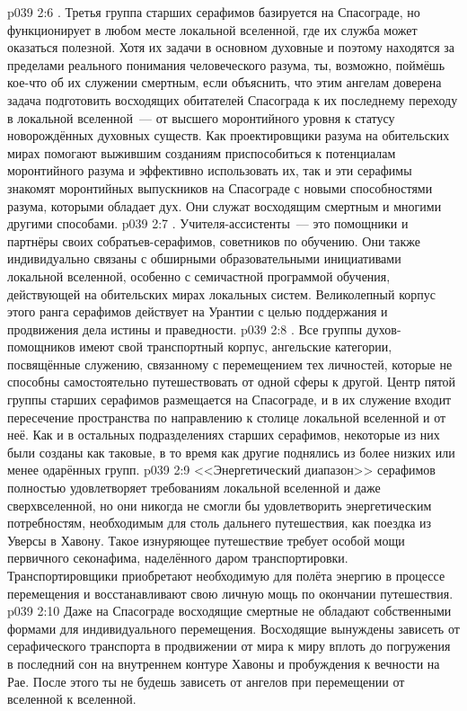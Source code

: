 \vs p039 2:6 . Третья группа старших серафимов базируется на Спасограде, но функционирует в любом месте локальной вселенной, где их служба может оказаться полезной. Хотя их задачи в основном духовные и поэтому находятся за пределами реального понимания человеческого разума, ты, возможно, поймёшь кое-что об их служении смертным, если объяснить, что этим ангелам доверена задача подготовить восходящих обитателей Спасограда к их последнему переходу в локальной вселенной~--- от высшего моронтийного уровня к статусу новорождённых духовных существ. Как проектировщики разума на обительских мирах помогают выжившим созданиям приспособиться к потенциалам моронтийного разума и эффективно использовать их, так и эти серафимы знакомят моронтийных выпускников на Спасограде с новыми способностями разума, которыми обладает дух. Они служат восходящим смертным и многими другими способами.
\vs p039 2:7 . Учителя\hyp{}ассистенты~--- это помощники и партнёры своих собратьев\hyp{}серафимов, советников по обучению. Они также индивидуально связаны с обширными образовательными инициативами локальной вселенной, особенно с семичастной программой обучения, действующей на обительских мирах локальных систем. Великолепный корпус этого ранга серафимов действует на Урантии с целью поддержания и продвижения дела истины и праведности.
\vs p039 2:8 . Все группы духов\hyp{}помощников имеют свой транспортный корпус, ангельские категории, посвящённые служению, связанному с перемещением тех личностей, которые не способны самостоятельно путешествовать от одной сферы к другой. Центр пятой группы старших серафимов размещается на Спасограде, и в их служение входит пересечение пространства по направлению к столице локальной вселенной и от неё. Как и в остальных подразделениях старших серафимов, некоторые из них были созданы как таковые, в то время как другие поднялись из более низких или менее одарённых групп.
\vs p039 2:9 \pc <<Энергетический диапазон>> серафимов полностью удовлетворяет требованиям локальной вселенной и даже сверхвселенной, но они никогда не смогли бы удовлетворить энергетическим потребностям, необходимым для столь дальнего путешествия, как поездка из Уверсы в Хавону. Такое изнуряющее путешествие требует особой мощи первичного секонафима, наделённого даром транспортировки. Транспортировщики приобретают необходимую для полёта энергию в процессе перемещения и восстанавливают свою личную мощь по окончании путешествия.
\vs p039 2:10 \pc Даже на Спасограде восходящие смертные не обладают собственными формами для индивидуального перемещения. Восходящие вынуждены зависеть от серафического транспорта в продвижении от мира к миру вплоть до погружения в последний сон на внутреннем контуре Хавоны и пробуждения к вечности на Рае. После этого ты не будешь зависеть от ангелов при перемещении от вселенной к вселенной.
